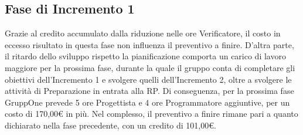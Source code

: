 \documentclass[../piano-di-progetto.tex]{subfiles}
\begin{document}
\subsection{Fase di Incremento 1}%
\label{sub:preventivo_a_finire/fase_di_incremento_1}

Grazie al credito accumulato dalla riduzione nelle ore Verificatore, il costo in eccesso risultato in questa fase non influenza il preventivo a finire.
D'altra parte, il ritardo dello sviluppo rispetto la pianificazione comporta un carico di lavoro maggiore per la prossima fase, durante la quale il gruppo conta di completare gli obiettivi dell'Incremento 1 e svolgere quelli dell'Incremento 2, oltre a svolgere le attività di Preparazione in entrata alla RP\@.
Di conseguenza, per la prossima fase GruppOne prevede 5 ore Progettista e 4 ore Programmatore aggiuntive, per un costo di 170,00€ in più.
Nel complesso, il preventivo a finire rimane pari a quanto dichiarato nella fase precedente, con un credito di 101,00€.


\end{document}
